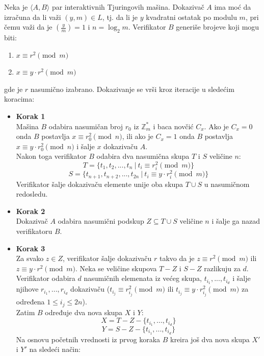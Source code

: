 \begin{npra} 
	Neka je $\langle A,B \rangle$ par interaktivnih Tjuringovih mašina. Dokazivač $A$ ima moć da izračuna da li važi $(y,m) \in L$, tj. da li je $y$ kvadratni ostatak po modulu $m$, pri čemu važi da je $\left ( \frac{y}{m}\right ) = 1$ i $n=\log_{2}m$. Verifikator $B$ generiše brojeve koji mogu biti:
	\begin{enumerate}
		\item $x \equiv r^2 \pmod m$
		\item $x \equiv y\cdot r^2 \pmod m$
	\end{enumerate}
	gde je $r$ nasumično izabrano. Dokazivanje se vrši kroz iteracije u sledećim koracima:
	\begin{itemize}
		\item {\bf Korak 1} \\
		Mašina $B$ odabira nasumičan broj $r_{0}$ iz $\mathbb{Z}^{*}_{m}$ i baca novčić $C_{x}$. Ako je $C_{x}=0$ onda $B$ postavlja $x\equiv r_{0}^{2} \pmod n$, ili ako je $C_{x}=1$ onda $B$ postavlja $x \equiv y \cdot r_{0}^{2} \pmod n$ i šalje $x$ dokazivaču $A$.\\
		Nakon toga verifikator $B$ odabira dva nasumična skupa $T$ i $S$ veličine $n$:
		$$T = \{t_{1},t_{2},...,t_{n}\ |\ t_{i} \equiv r^{2}_{i} \pmod m\}$$
		$$S = \{t_{n+1},t_{n+2},...,t_{2n}\ |\ t_{i} \equiv y \cdot r^{2}_{i} \pmod m\}$$
		Verifikator šalje dokazivaču elemente unije oba skupa $T\cup S$ u nasumičnom redosledu.
		\item {\bf Korak 2} \\
		Dokazivač $A$ odabira nasumični podskup $Z \subseteq T\cup S$ veličine $n$ i šalje ga nazad verifikatoru $B$.
		\item {\bf Korak 3} \\
		Za svako $z \in Z$, verifikator šalje dokazivaču $r$ takvo da je $z \equiv r^{2} \pmod m $ ili $z \equiv y \cdot r^{2} \pmod m $.
		Neka se veličine skupova $T-Z$ i $S-Z$ razlikuju za $d$. Verifikator odabira $d$ nasumičnih elemenata iz većeg skupa, $t_{i_{1}},...,t_{i_{d}}$ i šalje njihove $r_{i_{1}},...,r_{i_{d}}$ dokazivaču ($t_{i_{j}}\equiv r^{2}_{i_{j}} \pmod m$ ili $t_{i_{j}}\equiv y\cdot r^{2}_{i_{j}} \pmod m$ za određena $1 \leq i_{j}\leq 2n$).\\
		Zatim $B$ određuje dva nova skupa $X$ i $Y$:
		$$X = T-Z -\{t_{i_{1}},...,t_{i_{d}}\}$$
		$$Y = S-Z - \{t_{i_{1}},...,t_{i_{d}}\}$$
		Na osnovu početnih vrednosti iz prvog koraka $B$ kreira još dva nova skupa $X'$ i $Y'$ na sledeći način: \\

\end{itemize}
\end{npra}
